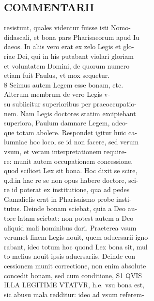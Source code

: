 \documentclass{article}
\begin{document}
\begin{pages}
\section*{COMMENTARII \\
                }resistunt, quales videntur fuisse isti Nomo- \\
                didascali, et bona pars Pharisaeorum apud Iu \\
                daeos. In aliis vero erat ex zelo Legis et glo- \\
                riae Dei, qui in his putabant violari gloriam \\
                et voluntatem Domini, de quorum numero \\
                etiam fuit Paulus, vt mox sequetur. \\
                8 Scimus autem Legem esse bonam, etc. \\
                Alterum membrum de vero Legis v- \\
                su subiicitur superioribus per praeoccupatio- \\
                nem. Nam Legis doctores statim excipiebant \\
                superiora, Paulum damnare Legem, adeo- \\
                que totam abolere. Respondet igitur huic ca- \\
                lumniae hoc loco, se id non facere, sed verum \\
                vsum, et veram interpretationem require- \\
                re: munit autem occupationem concessione, \\
                quod scilicet Lex sit bona. Hoc dixit se scire, \\
                q.d.in hac re se non opus habere doctore, sci- \\
                re id poterat ex institutione, qua ad pedes \\
                Gamalielis erat in Pharisaismo probe insti- \\
                tutus. Deinde bonam sciebat, quia a Deo au- \\
                tore latam sciebat: non potest autem a Deo \\
                aliquid mali hominibus dari. Praeterea vsum \\
                verumet finem Legis nouit, quem aduersarii igno- \\
                rabant, ideo totum hoc quond Lex bona sit, mul \\
                to melius nouit ipsis aduersariis. Deinde con- \\
                cessionem munit correctione, non enim absolute \\
                concedit bonam, sed cum conditione, S1 QVIS \\
                ILLA LEGITIME VTATVR, h.e. vsu bona est, \\
                sic abusu mala redditur: ideo ad vsum referem- \\
                

\end{pages}
\end{document}
